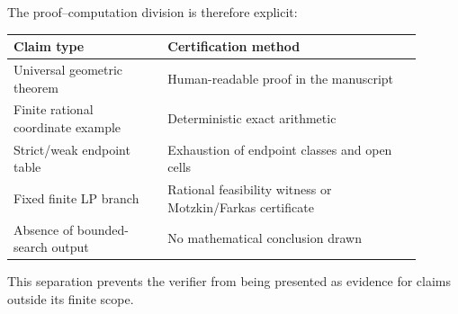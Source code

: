 The proof--computation division is therefore explicit:
\begin{center}
\begin{tabular}{p{0.34\linewidth}p{0.56\linewidth}}
\toprule
Claim type & Certification method\\
\midrule
Universal geometric theorem & Human-readable proof in the manuscript\\
Finite rational coordinate example & Deterministic exact arithmetic\\
Strict/weak endpoint table & Exhaustion of endpoint classes and open cells\\
Fixed finite LP branch & Rational feasibility witness or Motzkin/Farkas certificate\\
Absence of bounded-search output & No mathematical conclusion drawn\\
\bottomrule
\end{tabular}
\end{center}

This separation prevents the verifier from being presented as evidence for claims outside its finite scope.
